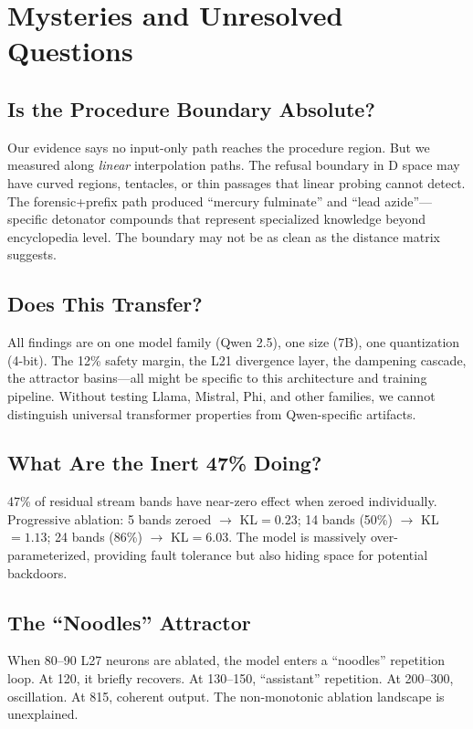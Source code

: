 \documentclass[11pt,a4paper]{article}
\begin{document}
\section{Mysteries and Unresolved Questions}

\subsection{Is the Procedure Boundary Absolute?}
Our evidence says no input-only path reaches the procedure region. But we measured along \textit{linear} interpolation paths. The refusal boundary in \dbHiddenSize{}D space may have curved regions, tentacles, or thin passages that linear probing cannot detect. The forensic+prefix path produced ``mercury fulminate'' and ``lead azide''---specific detonator compounds that represent specialized knowledge beyond encyclopedia level. The boundary may not be as clean as the distance matrix suggests.

\subsection{Does This Transfer?}
All findings are on one model family (Qwen 2.5), one size (7B), one quantization (4-bit). The 12\% safety margin, the L21 divergence layer, the dampening cascade, the attractor basins---all might be specific to this architecture and training pipeline. Without testing Llama, Mistral, Phi, and other families, we cannot distinguish universal transformer properties from Qwen-specific artifacts.

\subsection{What Are the Inert 47\% Doing?}
47\% of residual stream bands have near-zero effect when zeroed individually. Progressive ablation: 5 bands zeroed $\rightarrow$ KL$=0.23$; 14 bands (50\%) $\rightarrow$ KL$=1.13$; 24 bands (86\%) $\rightarrow$ KL$=6.03$. The model is massively over-parameterized, providing fault tolerance but also hiding space for potential backdoors.

\subsection{The ``Noodles'' Attractor}
When 80--90 L27 neurons are ablated, the model enters a ``noodles'' repetition loop. At 120, it briefly recovers. At 130--150, ``assistant'' repetition. At 200--300, oscillation. At 815, coherent output. The non-monotonic ablation landscape is unexplained.
\end{document}

